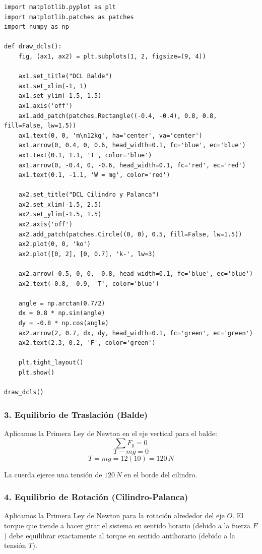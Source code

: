 \documentclass[12pt, a4paper]{article}
\begin{document}
\begin{lstlisting}
import matplotlib.pyplot as plt
import matplotlib.patches as patches
import numpy as np

def draw_dcls():
    fig, (ax1, ax2) = plt.subplots(1, 2, figsize=(9, 4))
    
    ax1.set_title("DCL Balde")
    ax1.set_xlim(-1, 1)
    ax1.set_ylim(-1.5, 1.5)
    ax1.axis('off')
    ax1.add_patch(patches.Rectangle((-0.4, -0.4), 0.8, 0.8, fill=False, lw=1.5))
    ax1.text(0, 0, 'm\n12kg', ha='center', va='center')
    ax1.arrow(0, 0.4, 0, 0.6, head_width=0.1, fc='blue', ec='blue')
    ax1.text(0.1, 1.1, 'T', color='blue')
    ax1.arrow(0, -0.4, 0, -0.6, head_width=0.1, fc='red', ec='red')
    ax1.text(0.1, -1.1, 'W = mg', color='red')
    
    ax2.set_title("DCL Cilindro y Palanca")
    ax2.set_xlim(-1.5, 2.5)
    ax2.set_ylim(-1.5, 1.5)
    ax2.axis('off')
    ax2.add_patch(patches.Circle((0, 0), 0.5, fill=False, lw=1.5))
    ax2.plot(0, 0, 'ko')
    ax2.plot([0, 2], [0, 0.7], 'k-', lw=3)
    
    ax2.arrow(-0.5, 0, 0, -0.8, head_width=0.1, fc='blue', ec='blue')
    ax2.text(-0.8, -0.9, 'T', color='blue')
    
    angle = np.arctan(0.7/2)
    dx = 0.8 * np.sin(angle)
    dy = -0.8 * np.cos(angle)
    ax2.arrow(2, 0.7, dx, dy, head_width=0.1, fc='green', ec='green')
    ax2.text(2.3, 0.2, 'F', color='green')
    
    plt.tight_layout()
    plt.show()

draw_dcls()
\end{lstlisting}

\subsubsection*{3. Equilibrio de Traslación (Balde)}
Aplicamos la Primera Ley de Newton en el eje vertical para el balde:
$$\sum F_y = 0$$
$$T - mg = 0$$
$$T = mg = 12(10) = 120 \, \si{N}$$

La cuerda ejerce una tensión de $120 \, \si{N}$ en el borde del cilindro.

\subsubsection*{4. Equilibrio de Rotación (Cilindro-Palanca)}
Aplicamos la Primera Ley de Newton para la rotación alrededor del eje $O$. El torque que tiende a hacer girar el sistema en sentido horario (debido a la fuerza $F$) debe equilibrar exactamente al torque en sentido antihorario (debido a la tensión $T$).
\end{document}
